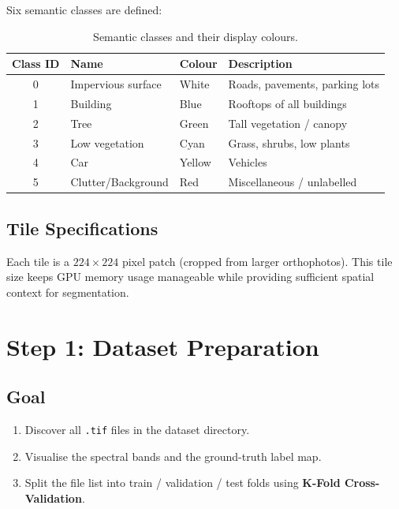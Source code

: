 \documentclass[12pt,a4paper]{article}
\begin{document}
Six semantic classes are defined:

\begin{table}[h!]
  \centering
  \caption{Semantic classes and their display colours.}
  \begin{tabular}{clll}
    \toprule
    \textbf{Class ID} & \textbf{Name} & \textbf{Colour} & \textbf{Description} \\
    \midrule
    0 & Impervious surface & White   & Roads, pavements, parking lots \\
    1 & Building           & Blue    & Rooftops of all buildings \\
    2 & Tree               & Green   & Tall vegetation / canopy \\
    3 & Low vegetation     & Cyan    & Grass, shrubs, low plants \\
    4 & Car                & Yellow  & Vehicles \\
    5 & Clutter/Background & Red     & Miscellaneous / unlabelled \\
    \bottomrule
  \end{tabular}
\end{table}

\subsection{Tile Specifications}

Each tile is a $224 \times 224$ pixel patch (cropped from larger orthophotos).
This tile size keeps GPU memory usage manageable while providing sufficient
spatial context for segmentation.

\section{Step 1: Dataset Preparation}

\subsection{Goal}

\begin{enumerate}[itemsep=2pt]
  \item Discover all \texttt{.tif} files in the dataset directory.
  \item Visualise the spectral bands and the ground-truth label map.
  \item Split the file list into train / validation / test folds using
        \textbf{K-Fold Cross-Validation}.
\end{enumerate}
\end{document}
